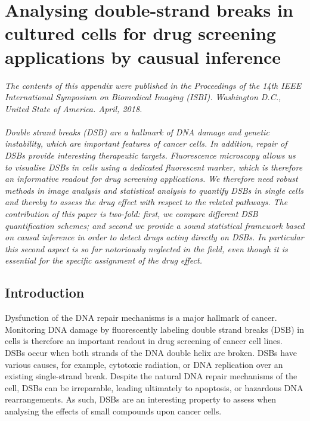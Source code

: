 
\chapter{Analysing double-strand breaks in cultured cells for drug screening applications by causual inference} %
\label{AppendixD} %


\emph{The contents of this appendix were published in the Proceedings of the 14th IEEE International Symposium on Biomedical Imaging (ISBI). Washington D.C., United State of America. April, 2018. \\ \\ Double strand breaks (DSB) are a hallmark of DNA damage and genetic instability, which are important features of cancer cells.  In addition, repair of DSBs provide interesting therapeutic targets. Fluorescence microscopy allows us to visualise DSBs in cells using a dedicated fluorescent marker, which is therefore an informative readout for drug screening applications. We therefore need robust methods in image analysis and statistical analysis to quantify DSBs in single cells and thereby to assess the drug effect with respect to the related pathways. The contribution of this paper is two-fold: first, we compare different DSB quantification schemes; and second we provide a sound statistical framework based on causal inference in order to detect drugs acting directly on DSBs. In particular this second aspect is so far notoriously neglected in the field, even though it is essential for the specific assignment of the drug effect.}

\section{Introduction}

 Dysfunction of the DNA repair mechanisms is a major hallmark of cancer. Monitoring DNA damage by fluorescently labeling double strand breaks (DSB) in cells is therefore an important readout in drug screening of cancer cell lines. DSBs  occur when both strands of the DNA double helix are broken. DSBs have various causes, for example, cytotoxic radiation, or DNA replication over an existing single-strand break. Despite the natural DNA repair mechanisms of the cell, DSBs can be irreparable, leading ultimately to apoptosis, or hazardous DNA rearrangements. As such, DSBs are an interesting property to assess when analysing the effects of small compounds upon cancer cells.

